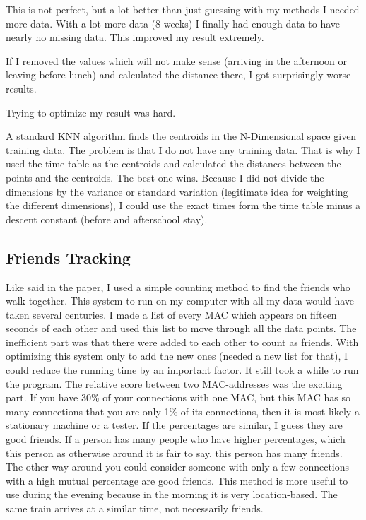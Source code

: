\documentclass[11pt]{article}
\begin{document}
This is not perfect, but a lot better than just guessing with my methods I needed more data. With a lot more data  (8 weeks) I finally had enough data to have nearly no missing data. This improved my result extremely.

If I removed the values which will not make sense (arriving in the afternoon or leaving before lunch) and calculated the distance there, I got surprisingly worse results.

Trying to optimize my result was hard.

A standard KNN algorithm finds the centroids in the N-Dimensional space given training data. The problem is that I do not have any training data. That is why I used the time-table as the centroids and calculated the distances between the points and the centroids. The best one wins. Because I did not divide the dimensions by the variance or standard variation (legitimate idea for weighting the different dimensions), I could use the exact times form the time table minus a descent constant (before and afterschool stay).



\subsection{Friends Tracking}
Like said in the paper, I used a simple counting method to find the friends who walk together. This system to run on my computer with all my data would have taken several centuries. I made a list of every MAC which appears on fifteen seconds of each other and used this list to move through all the data points. The inefficient part was that there were added to each other to count as friends. With optimizing this system only to add the new ones (needed a new list for that), I could reduce the running time by an important factor. It still took a while to run the program. The relative score between two MAC-addresses was the exciting part. If you have 30\% of your connections with one MAC, but this MAC has so many connections that you are only 1\% of its connections, then it is most likely a stationary machine or a tester. If the percentages are similar, I guess they are good friends. If a person has many people who have higher percentages, which this person as otherwise around it is fair to say, this person has many friends. The other way around you could consider someone with only a few connections with a high mutual percentage are good friends.
This method is more useful to use during the evening because in the morning it is very location-based. The same train arrives at a similar time, not necessarily friends.
\end{document}
